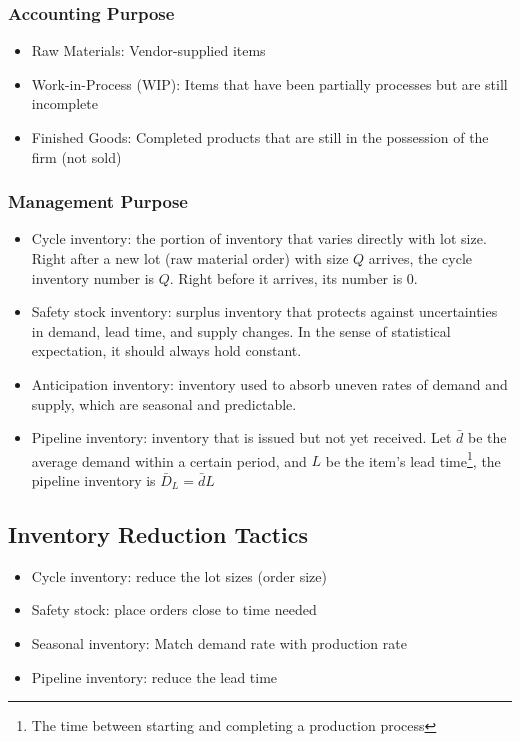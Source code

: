 \documentclass{article}
\begin{document}
\subsubsection{Accounting Purpose}
\begin{itemize}
	\item Raw Materials: Vendor-supplied items
	\item Work-in-Process (WIP): Items that have been partially processes but are still incomplete
	\item Finished Goods: Completed products that are still in the possession of the firm (not sold)
\end{itemize}

\subsubsection{Management Purpose}
\begin{itemize}
	\item Cycle inventory: the portion of inventory that varies directly with lot size.
	      Right after a new lot (raw material order) with size $Q$ arrives, the cycle inventory number is $Q$.
	      Right before it arrives, its number is $0$.
	\item Safety stock inventory: surplus inventory that protects against uncertainties in demand, lead time, and supply changes.
	      In the sense of statistical expectation, it should always hold constant.
	\item Anticipation inventory: inventory used to absorb uneven rates of demand and supply, which are seasonal and predictable.
	\item Pipeline inventory: inventory that is issued but not yet received.
	      Let $\bar{d}$ be the average demand within a certain period,
	      and $L$ be the item's lead time\footnote{The time between starting and completing a production process},
	      the pipeline inventory is $\bar{D}_L = \bar{d}L$
\end{itemize}

\subsection{Inventory Reduction Tactics}

\begin{itemize}
	\item Cycle inventory: reduce the lot sizes (order size)
	\item Safety stock: place orders close to time needed
	\item Seasonal inventory: Match demand rate with production rate
	\item Pipeline inventory: reduce the lead time
\end{itemize}
\end{document}
